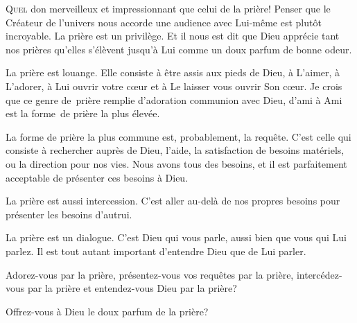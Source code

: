 

\lettrine{Q}{uel} don merveilleux et impressionnant que celui de la prière!
 Penser que le Créateur de l'univers nous accorde une audience avec Lui-même
 est plutôt incroyable. La prière est un privilège.
 Et il nous est dit que Dieu apprécie tant nos prières qu'elles s'élèvent
 jusqu'à Lui comme un doux parfum de bonne odeur.

La prière est louange. 
 Elle consiste à être assis aux pieds de Dieu, à L'aimer, à L'adorer,
 à Lui ouvrir votre c\oe{}ur et à Le laisser vous ouvrir Son c\oe{}ur.
 Je crois que ce genre de~prière remplie d'adoration
 \ocadr communion avec Dieu, d'ami à Ami \fcadr{}
 est la forme~de prière la plus élevée.


La forme de prière la plus commune est, probablement, la requête.
 C'est celle qui consiste à rechercher auprès de Dieu, 
 l'aide, la satisfaction de besoins matériels, ou la direction pour nos vies.
 Nous avons tous des besoins, et il est parfaitement acceptable
 de présenter ces besoins à Dieu.

La prière est aussi intercession. 
 C'est aller au-delà de nos propres besoins pour présenter les besoins d'autrui.

La prière est un dialogue. C'est Dieu qui vous parle,
 aussi bien que vous qui Lui parlez.
 Il est tout autant 
 important d'entendre Dieu que de Lui parler.

Adorez-vous par la prière, présentez-vous vos requêtes par la prière,
 intercédez-vous par la prière et entendez-vous Dieu par la prière?

Offrez-vous à Dieu le doux parfum de la prière?

\dvrule




